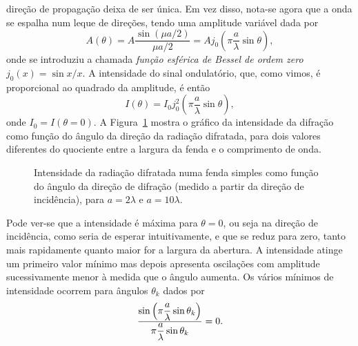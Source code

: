 direção de propagação deixa de ser única. Em vez disso, nota-se agora que a onda
se espalha num leque de direções, tendo uma amplitude variável dada por
\begin{equation*}
    A(\theta)=A\frac{\sin(\mu a/2)}{\mu
    a/2}=Aj_0(\pi\frac{a}{\lambda}\sin\theta),
\end{equation*}
onde se introduziu a chamada \emph{função esférica de Bessel de ordem zero}
$j_0(x)=\sin x/x$. A intensidade do sinal ondulatório, que, como vimos, é
proporcional ao quadrado da amplitude, é então
\begin{equation}
    I(\theta)= I_0 j_0^2(\pi\frac{a}{\lambda}\sin\theta),
\end{equation}
onde $I_0=I(\theta=0)$. A Figura~\ref{fig:oof120} mostra o gráfico da
intensidade da difração como função do ângulo da direção da radiação difratada,
para dois valores diferentes do quociente entre a largura da fenda e o
comprimento de onda.
\begin{figure}[htb]
\begin{center}
\caption{Intensidade da radiação difratada numa fenda simples como função do
ângulo da direção de difração (medido a partir da direção de incidência), para
$a=2\lambda$ e $a=10\lambda$.%
\label{fig:oof120}}
\end{center}
\end{figure}
Pode ver-se que a intensidade é máxima para $\theta=0$, ou seja na direção de
incidência, como seria de esperar intuitivamente, e que se reduz para zero,
tanto mais rapidamente quanto maior for a largura da abertura. A intensidade
atinge um primeiro valor mínimo mas depois apresenta oscilações com amplitude
sucessivamente menor à medida que o ângulo aumenta. Os vários mínimos de
intensidade ocorrem para ângulos $\theta_k$ dados por
\begin{equation*}
    \frac{\displaystyle%
    \sin\left(\pi\frac a \lambda \sin\theta_k\right)}{%
    \displaystyle \pi\frac a \lambda \sin\theta_k}=0.
\end{equation*}
